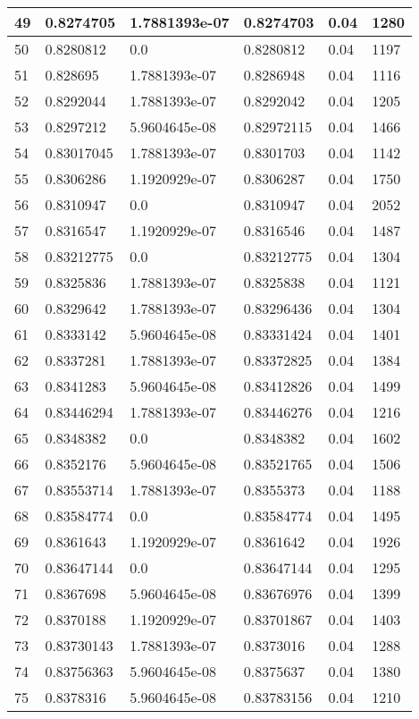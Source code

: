 \begin{longtable}{|l|l|l|l|l|l|}
49 & 0.8274705 & 1.7881393e-07 & 0.8274703 & 0.04 & 1280 \\ \hline 
50 & 0.8280812 & 0.0 & 0.8280812 & 0.04 & 1197 \\ \hline 
51 & 0.828695 & 1.7881393e-07 & 0.8286948 & 0.04 & 1116 \\ \hline 
52 & 0.8292044 & 1.7881393e-07 & 0.8292042 & 0.04 & 1205 \\ \hline 
53 & 0.8297212 & 5.9604645e-08 & 0.82972115 & 0.04 & 1466 \\ \hline 
54 & 0.83017045 & 1.7881393e-07 & 0.8301703 & 0.04 & 1142 \\ \hline 
55 & 0.8306286 & 1.1920929e-07 & 0.8306287 & 0.04 & 1750 \\ \hline 
56 & 0.8310947 & 0.0 & 0.8310947 & 0.04 & 2052 \\ \hline 
57 & 0.8316547 & 1.1920929e-07 & 0.8316546 & 0.04 & 1487 \\ \hline 
58 & 0.83212775 & 0.0 & 0.83212775 & 0.04 & 1304 \\ \hline 
59 & 0.8325836 & 1.7881393e-07 & 0.8325838 & 0.04 & 1121 \\ \hline 
60 & 0.8329642 & 1.7881393e-07 & 0.83296436 & 0.04 & 1304 \\ \hline 
61 & 0.8333142 & 5.9604645e-08 & 0.83331424 & 0.04 & 1401 \\ \hline 
62 & 0.8337281 & 1.7881393e-07 & 0.83372825 & 0.04 & 1384 \\ \hline 
63 & 0.8341283 & 5.9604645e-08 & 0.83412826 & 0.04 & 1499 \\ \hline 
64 & 0.83446294 & 1.7881393e-07 & 0.83446276 & 0.04 & 1216 \\ \hline 
65 & 0.8348382 & 0.0 & 0.8348382 & 0.04 & 1602 \\ \hline 
66 & 0.8352176 & 5.9604645e-08 & 0.83521765 & 0.04 & 1506 \\ \hline 
67 & 0.83553714 & 1.7881393e-07 & 0.8355373 & 0.04 & 1188 \\ \hline 
68 & 0.83584774 & 0.0 & 0.83584774 & 0.04 & 1495 \\ \hline 
69 & 0.8361643 & 1.1920929e-07 & 0.8361642 & 0.04 & 1926 \\ \hline 
70 & 0.83647144 & 0.0 & 0.83647144 & 0.04 & 1295 \\ \hline 
71 & 0.8367698 & 5.9604645e-08 & 0.83676976 & 0.04 & 1399 \\ \hline 
72 & 0.8370188 & 1.1920929e-07 & 0.83701867 & 0.04 & 1403 \\ \hline 
73 & 0.83730143 & 1.7881393e-07 & 0.8373016 & 0.04 & 1288 \\ \hline 
74 & 0.83756363 & 5.9604645e-08 & 0.8375637 & 0.04 & 1380 \\ \hline 
75 & 0.8378316 & 5.9604645e-08 & 0.83783156 & 0.04 & 1210 \\ \hline 
\end{longtable}